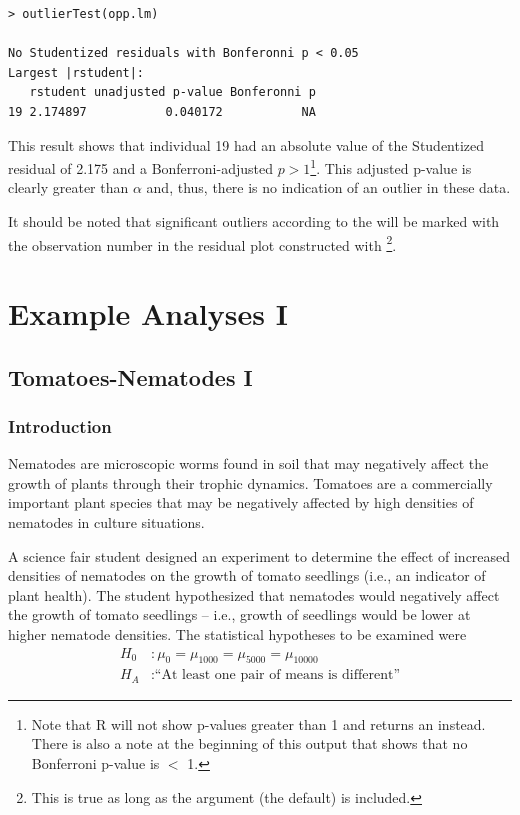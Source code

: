 \documentclass[10pt,openany]{book}\usepackage[]{graphicx}\usepackage[]{color}
\makeatletter
\newenvironment{kframe}{%
 \def\at@end@of@kframe{}%
 \ifinner\ifhmode%
  \def\at@end@of@kframe{\end{minipage}}%
  \begin{minipage}{\columnwidth}%
 \fi\fi%
 \def\FrameCommand##1{\hskip\@totalleftmargin \hskip-\fboxsep
 \colorbox{shadecolor}{##1}\hskip-\fboxsep
     \hskip-\linewidth \hskip-\@totalleftmargin \hskip\columnwidth}%
 \MakeFramed {\advance\hsize-\width
   \@totalleftmargin\z@ \linewidth\hsize
   \@setminipage}}%
 {\par\unskip\endMakeFramed%
 \at@end@of@kframe}
\newenvironment{knitrout}{}{} %
\makeatother
\begin{document}
\begin{knitrout}
\color{fgcolor}\begin{kframe}
\begin{verbatim}
> outlierTest(opp.lm)

No Studentized residuals with Bonferonni p < 0.05
Largest |rstudent|:
   rstudent unadjusted p-value Bonferonni p
19 2.174897           0.040172           NA
\end{verbatim}
\end{kframe}
\end{knitrout}

This result shows that individual 19 had an absolute value of the Studentized residual of 2.175 and a Bonferroni-adjusted $p>1$\footnote{Note that R will not show p-values greater than 1 and returns an  instead.  There is also a note at the beginning of this output that shows that no Bonferroni p-value is $<$ 1.}.  This adjusted p-value is clearly greater than $\alpha$ and, thus, there is no indication of an outlier in these data.

It should be noted that significant outliers according to the  will be marked with the observation number in the residual plot constructed with \footnote{This is true as long as the  argument (the default) is included.}.


\section{Example Analyses I}
\subsection{Tomatoes-Nematodes I} \label{sect:OWAEx1A}
\subsubsection*{Introduction}


Nematodes are microscopic worms found in soil that may negatively affect the growth of plants through their trophic dynamics.  Tomatoes are a commercially important plant species that may be negatively affected by high densities of nematodes in culture situations.

A science fair student designed an experiment to determine the effect of increased densities of nematodes on the growth of tomato seedlings (i.e., an indicator of plant health).  The student hypothesized that nematodes would negatively affect the growth of tomato seedlings -- i.e., growth of seedlings would be lower at higher nematode densities.  The statistical hypotheses to be examined were
\[ \begin{split}
   H_{0}&: \mu_{0} = \mu_{1000} = \mu_{5000} = \mu_{10000} \\
   H_{A}&:\text{``At least one pair of means is different''}
\end{split} \]
\end{document}
